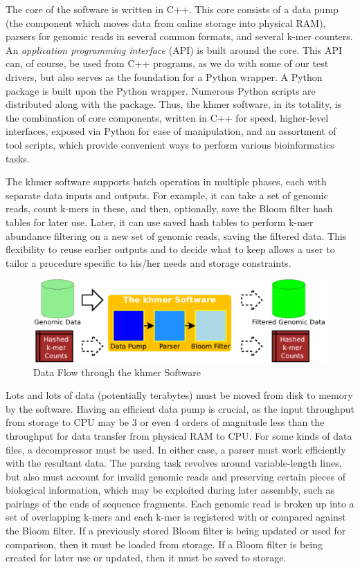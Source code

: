 \documentclass{article}
\begin{document}
The core of the software is written in C++. This core consists of a data pump (the
component which moves data from online storage into physical RAM), parsers for
genomic reads in several common formats, and several k-mer counters. An
\textit{application programming interface} (API) is built around the core. This
API can, of course, be used from C++ programs, as we do with some of our test
drivers, but also serves as the foundation for a Python wrapper. A Python
package is built upon the Python wrapper. Numerous Python scripts are
distributed along with the package. Thus, the khmer software, in its totality,
is the combination of core components, written in C++ for speed, higher-level
interfaces, exposed via Python for ease of manipulation, and an assortment of
tool scripts, which provide convenient ways to perform various bioinformatics
tasks.

The khmer software supports batch operation in multiple phases, each with
separate data inputs and outputs. For example, it can take a set of genomic
reads, count k-mers in these, and then, optionally, save the Bloom filter hash
tables for later use. Later, it can use saved hash tables to perform k-mer
abundance filtering on a new set of genomic reads, saving the filtered data.
This flexibility to reuse earlier outputs and to decide what to keep allows a
user to tailor a procedure specific to his/her needs and storage constraints.

\begin{figure}[ht!]
\centering
\includegraphics[scale=0.4]{data_flow.pdf}
\caption{Data Flow through the khmer Software}
\label{khmerDataFlow}
\end{figure}

Lots and lots of data (potentially terabytes) must be moved from disk to memory
by the software. Having an efficient data pump is crucial, as the input
throughput from storage to CPU may be 3 or even 4 orders of magnitude less than
the throughput for data transfer from physical RAM to CPU. For some kinds of
data files, a decompressor must be used. In either case, a parser must work
efficiently with the resultant data. The parsing task revolves around
variable-length lines, but also must account for invalid genomic reads and
preserving certain pieces of biological information, which may be exploited
during later assembly, such as pairings of the ends of sequence fragments. Each
genomic read is broken up into a set of overlapping k-mers and each k-mer is
registered with or compared against the Bloom filter.  If a previously stored
Bloom filter is being updated or used for comparison, then it must be loaded
from storage.  If a Bloom filter is being created for later use or updated,
then it must be saved to storage.
\end{document}

